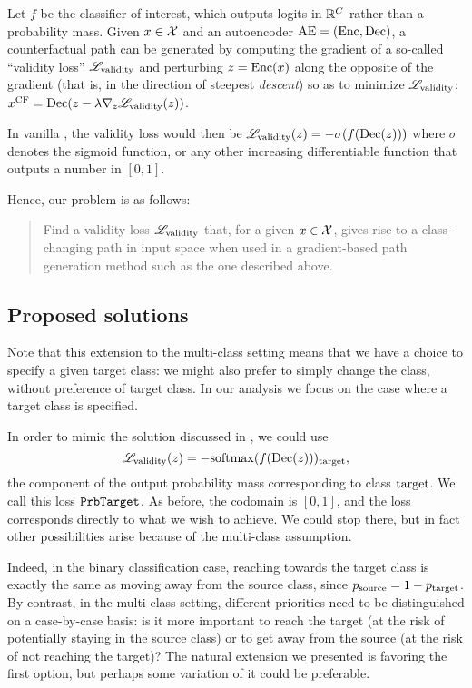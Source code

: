 \documentclass[../main.tex]{subfiles}
\begin{document}
Let $f$ be the classifier of interest, which outputs logits in $\mathbb{R}^C$ rather than a probability mass.
Given $x \in \mathcal{X}$ and an autoencoder $\mathrm{AE} = (\operatorname{Enc}, \operatorname{Dec})$, a counterfactual path can be generated by computing the gradient of a so-called ``validity loss'' $\mathscr{L}_\text{validity}$ and perturbing $z = \operatorname{Enc}(x)$ along the opposite of the gradient (that is, in the direction of steepest \emph{descent}) so as to minimize $\mathscr{L}_\text{validity}$:
$x^\mathrm{CF} = \operatorname{Dec}(z - \lambda \nabla_z \mathscr{L}_\text{validity}(z))$.

In vanilla \ls{}, the validity loss would then be $\mathscr{L}_\text{validity}(z) = - \sigma(f(\operatorname{Dec}(z)))$ where $\sigma$ denotes the sigmoid function, or any other increasing differentiable function that outputs a number in $[0, 1]$.

Hence, our problem is as follows:
\begin{quote}
Find a validity loss $\mathscr{L}_\text{validity}$ that, for a given $x \in \mathcal{X}$, gives rise to a class-changing path in input space when used in a gradient-based path generation method such as the one described above.
\end{quote}

\subsection{Proposed solutions}

Note that this extension to the multi-class setting means that we have a choice to specify a given target class: we might also prefer to simply change the class, without preference of target class. In our analysis we focus on the case where a target class is specified.

In order to mimic the solution discussed in \cite{cohenGifsplanation2022}, we could use
\begin{equation}
    \mathscr{L}_\text{validity}(z) = -\mathrm{softmax}(f(\operatorname{Dec}(z)))_{\mathrm{target}},
\end{equation}
\ie{} the component of the output probability mass corresponding to class $\mathrm{target}$.
We call this loss $\mathtt{PrbTarget}$.
As before, the codomain is $[0, 1]$, and the loss corresponds directly to what we wish to achieve.
We could stop there, but in fact other possibilities arise because of the multi-class assumption.

Indeed, in the binary classification case, reaching towards the target class is exactly the same as moving away from the source class, since $p_{\mathrm{source}} = 1 - p_{\mathrm{target}}$.
By contrast, in the multi-class setting, different priorities need to be distinguished on a case-by-case basis: is it more important to reach the target (at the risk of potentially staying in the source class) or to get away from the source (at the risk of not reaching the target)?
The natural extension we presented is favoring the first option, but perhaps some variation of it could be preferable.
\end{document}
